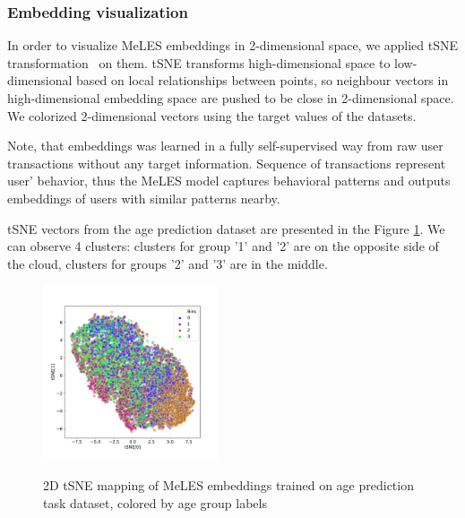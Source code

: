 \documentclass[sigconf, anonymous]{acmart}
\begin{document}
\subsubsection{Embedding visualization}

In order to visualize MeLES embeddings in 2-dimensional space, we applied tSNE transformation~\cite{maaten2008visualizing} on them. tSNE transforms high-dimensional space to low-dimensional based on local relationships between points, so neighbour vectors in high-dimensional embedding space are pushed to be close in 2-dimensional space. We colorized 2-dimensional vectors using the target values of the datasets.

Note, that embeddings was learned in a fully self-supervised way from raw user transactions without any target information. Sequence of transactions represent user' behavior, thus the MeLES model captures behavioral patterns and outputs embeddings of users with similar patterns nearby.

tSNE vectors from the age prediction dataset are presented in the Figure \ref{fig-tsne-age}. We can observe 4 clusters: clusters for group '1' and '2' are on the opposite side of the cloud, clusters for groups '2' and '3' are in the middle.



\begin{figure}[ht]
  \caption{2D tSNE mapping of MeLES embeddings trained on age prediction task dataset, colored by age group labels}
  \includegraphics[width=0.46\textwidth]{figures/age-pred-tsne.pdf}
  \label{fig-tsne-age}
\end{figure}
\end{document}
